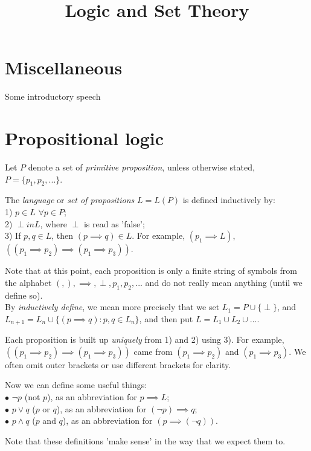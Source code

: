 \documentclass[a4paper]{article}
\begin{document}
\title{Logic and Set Theory}

\maketitle

\newpage

\tableofcontents

\newpage

\section{Miscellaneous}

Some introductory speech

\newpage

\section{Propositional logic}
Let $P$ denote a set of \emph{primitive proposition}, unless otherwise stated, $P=\{p_1,p_2,...\}$.

The \emph{language} or \emph{set of propositions} $L=L(P)$ is defined inductively by:\\
1) $p \in L$ $\forall p \in P$;\\
2) $\perp in L$, where $\perp$ is read as 'false';\\
3) If $p,q \in L$, then $(p \implies q) \in L$. For example, $(p_1 \implies L)$, $((p_1 \implies p_2) \implies (p_1 \implies p_3))$.

Note that at this point, each proposition is only a finite string of symbols from the alphabet $(,),\implies,\perp,p_1,p_2,...$ and do not really mean anything (until we define so).\\
By \emph{inductively define}, we mean more precisely that we set $L_1 = P \cup \{\perp\}$, and $L_{n+1} = L_n \cup \{(p \implies q):p,q \in L_n\}$, and then put $L = L_1 \cup L_2 \cup ...$.

Each proposition is built up \emph{uniquely} from 1) and 2) using 3). For example, $((p_1 \implies p_2) \implies (p_1 \implies p_3))$ came from $(p_1 \implies p_2)$ and $(p_1 \implies p_3)$. We often omit outer brackets or use different brackets for clarity.

Now we can define some useful things:\\
$\bullet$ $\neg p$ (not $p$), as an abbreviation for $p \implies L$;\\
$\bullet$ $p \vee q$ ($p$ or $q$), as an abbreviation for $(\neg p) \implies q$;\\
$\bullet$ $p \wedge q$ ($p$ and $q$), as an abbreviation for $(p \implies (\neg q))$.

Note that these definitions 'make sense' in the way that we expect them to.
\end{document}
